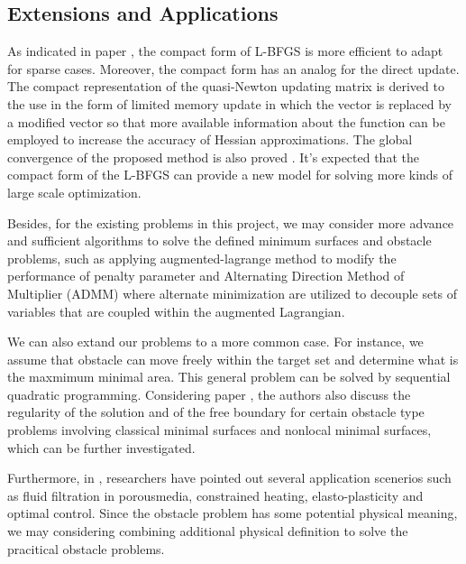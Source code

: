 \subsection{Extensions and Applications}
As indicated in paper \cite{yueting2007compact}, the compact form of L-BFGS is more efficient to adapt for sparse cases. Moreover, the compact form has an analog for the direct update. The compact representation of the quasi-Newton updating matrix is derived to the use in the form of limited memory update in which the vector is replaced by a modified vector so that more available information about the function can be employed to increase the accuracy of Hessian approximations. The global convergence of the proposed method is also proved \cite{yueting2007compact}. It’s expected that the compact form of the L-BFGS can provide a new model for solving more kinds of large scale optimization. 

Besides, for the existing problems in this project, we may consider more advance and sufficient algorithms to solve the defined minimum surfaces and obstacle problems, such as applying augmented-lagrange method to modify the performance of penalty parameter and Alternating Direction Method of Multiplier (ADMM) where alternate minimization are utilized to decouple sets of variables that are coupled within the augmented Lagrangian.

We can also extand our problems to a more common case. For instance, we assume that obstacle can move freely within the target set and determine what is the maxmimum minimal area. This general problem can be solved by 
sequential quadratic programming. Considering paper \cite{caffarelli2016obstacle}, the authors also discuss the regularity of the solution and of the free boundary for certain obstacle type problems involving classical minimal surfaces and nonlocal minimal surfaces, which can be further investigated.

Furthermore, in \cite{attouch2014variational}, researchers have pointed out several application scenerios such as fluid filtration in porousmedia, constrained heating, elasto-plasticity and optimal control. Since the obstacle problem has some potential physical meaning, we may considering combining additional physical definition to solve the pracitical obstacle problems.

